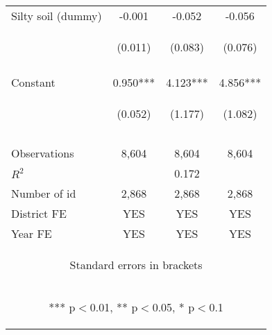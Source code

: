 \begin{center}
\begin{tabular}{lccc}
Silty soil (dummy) & -0.001 & -0.052 & -0.056 \\
 & \begin{footnotesize}(0.011)\end{footnotesize} & \begin{footnotesize}(0.083)\end{footnotesize} & \begin{footnotesize}(0.076)\end{footnotesize} \\
\vspace{4pt} & \begin{footnotesize}[0.952]\end{footnotesize} & \begin{footnotesize}[0.527]\end{footnotesize} & \begin{footnotesize}[0.458]\end{footnotesize} \\
Constant & 0.950*** & 4.123*** & 4.856*** \\
 & \begin{footnotesize}(0.052)\end{footnotesize} & \begin{footnotesize}(1.177)\end{footnotesize} & \begin{footnotesize}(1.082)\end{footnotesize} \\
 & \begin{footnotesize}[0.000]\end{footnotesize} & \begin{footnotesize}[0.000]\end{footnotesize} & \begin{footnotesize}[0.000]\end{footnotesize} \\
\vspace{4pt} & \begin{footnotesize}\end{footnotesize} & \begin{footnotesize}\end{footnotesize} & \begin{footnotesize}\end{footnotesize} \\
Observations & 8,604 & 8,604 & 8,604 \\
$R^2$ &  & 0.172 &  \\
Number of id & 2,868 & 2,868 & 2,868 \\
District FE & YES & YES & YES \\
 Year FE & YES & YES & YES \\ \hline
\multicolumn{4}{c}{\begin{footnotesize} Standard errors in brackets\end{footnotesize}} \\
\multicolumn{4}{c}{\begin{footnotesize} *** p$<$0.01, ** p$<$0.05, * p$<$0.1\end{footnotesize}} \\
\end{tabular}
\end{center}
